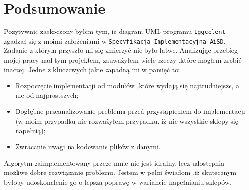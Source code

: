 \documentclass{article}
\begin{document}
\section{Podsumowanie}
Pozytywnie zaskoczony byłem tym, iż diagram UML programu \verb|Eggcelent| zgadzał się z moimi założeniami w \verb|Specyfikacja Implementacyjna AiSD|. Zadanie z którym przyszło mi się zmierzyć nie było łatwe. Analizując przebieg mojej pracy nad tym projektem, zauważyłem wiele rzeczy ,które mogłem zrobić inaczej. 
Jedne z kluczowych jakie zapadną mi w pamięć to:
\begin{itemize}
\item Rozpoczęcie implementacji od modułów ,które wydają się najtrudniejsze, a nie od najprostszych;
\item Dogłębne przeanalizowanie problemu przed przystąpieniem do implementacji (w moim przypadku nie rozważyłem przypadku, iż nie wszystkie sklepy się napełnią);
\item Zwracanie uwagi na kodowanie plików z danymi.
\end{itemize}
Algorytm zaimplementowany przeze mnie nie jest idealny, lecz udostępnia możliwe dobre rozwiązanie problemu. Jestem w pełni świadom ,iż skutecznym byłoby udoskonalenie go o lepszą poprawę w wariancie napełnianiu sklepów.
\end{document}
